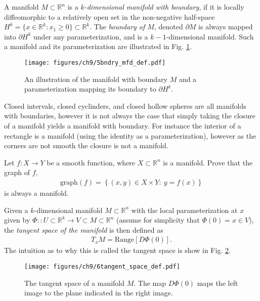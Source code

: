 \begin{definition}
	A manifold $M\subset \mathbb{R}^{n}$ is a \emph{$k$-dimensional manifold with boundary}, if it is locally diffeomorphic to a relatively open set in the non-negative half-space $H^{k}=\{x\in \mathbb{R}^k: x_1 \geq 0\} \subset \mathbb{R}^{k}$. The \emph{boundary of $M$}, denoted $\partial M$ is always mapped into $\partial H^{k}$ under any parameterization, and is a $k-1$-dimensional manifold. Such a manifold and its parameterization are illustrated in Fig. \ref{fig:bndry_mfd_def}.
	\begin{figure}[h!]
		\centering
		\texttt{[image: figures/ch9/5bndry\_mfd\_def.pdf]}
		\caption{An illustration of the manifold with boundary $M$ and a parameterization mapping its boundary to $\partial H^{k}$.}
		\label{fig:bndry_mfd_def}
	\end{figure}
\end{definition}

Closed intervals, closed cyclinders, and closed hollow spheres are all manifolds with boundaries, however it is not always the case that simply taking the closure of a manifold yields a manifold with boundary. For instance the interior of a rectangle is a manifold (using the identity as a parameterization), however as the corners are not smooth the closure is not a manifold.

\begin{exercise}
Let $f:X\rightarrow Y$ be a smooth function, where $X\subset\mathbb{R}^{n}$
is a manifold. Prove that the graph of $f$,
\begin{align}
\mathrm{graph}(f)=\left\{ (x,y)\in X\times Y:\ y=f(x)\right\} 
\end{align}
is always a manifold.
\end{exercise}

\begin{definition}
	Given a $k$-dimensional manifold $M\subset \mathbb{R}^{n}$ with the local parameterization at $x$ given by $\Phi:: U\subset \mathbb{R}^k \to V\subset M \subset \mathbb{R}^n$ (assume for simplicity that $\Phi(0)=x\in V$), the \emph{tangent space of the manifold} is then defined as
	\begin{align}
		\boxed{
			T_{x}M= \textrm{Range} [D\Phi(0)].
		}
	\end{align}
	The intuition as to why this is called the tangent space is show in Fig. \ref{fig:tangent_space_def}.
	\begin{figure}[h!]
		\centering
		\texttt{[image: figures/ch9/6tangent\_space\_def.pdf]}
		\caption{The tangent space of a manifold $M$. The map $D\Phi(0)$ maps the left image to the plane indicated in the right image.}
		\label{fig:tangent_space_def}
	\end{figure}
\end{definition}

